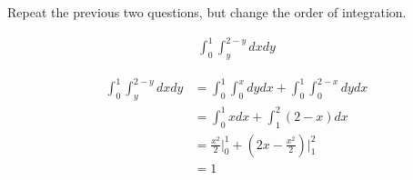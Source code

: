 Repeat the previous two questions, but change the order of integration.

\begin{align*}
    \int_{0}^{1} \int_{y}^{2-y} dx dy
\end{align*}

\begin{solution}
    \begin{align*}
        \int_{0}^{1} \int_{y}^{2-y} dx dy &= \int_{0}^{1} \int_{0}^{x} dy dx + \int_{0}^{1} \int_{0}^{2-x} dy dx \\
        &= \int_{0}^{1} xdx + \int_{1}^{2} \left(2 - x\right)dx \\
        &= \frac{x^2}{2}\bigg|_{0}^{1} + \left(2x - \frac{x^2}{2}\right)\bigg|_{1}^{2} \\
        &= 1
    \end{align*}
\end{solution}
